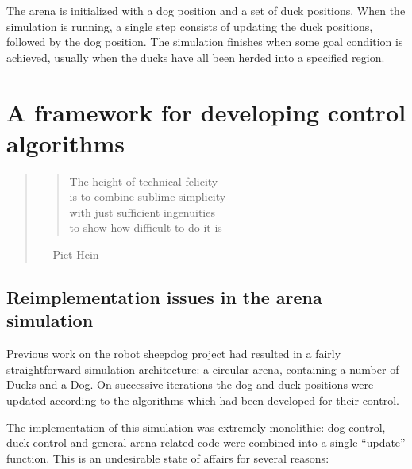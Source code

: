 \documentclass[a4paper]{report}
\begin{document}
The arena is initialized with a dog position and a set of duck
positions. When the simulation is running, a single step consists of
updating the duck positions, followed by the dog position. The
simulation finishes when some goal condition is achieved, usually when
the ducks have all been herded into a specified region.

\chapter{A framework for developing control algorithms}

\begin{quote}
  \begin{verse}
    The height of technical felicity\\
    is to combine sublime simplicity\\
    with just sufficient ingenuities\\
    to show how difficult to do it is
  \end{verse}
  {\hspace{5cm}--- Piet Hein}
\end{quote}

\section{Reimplementation issues in the arena simulation}

Previous work on the robot sheepdog project had resulted in a fairly
straightforward simulation architecture: a circular arena, containing
a number of Ducks and a Dog. On successive iterations the dog and duck
positions were updated according to the algorithms which had been
developed for their control.

The implementation of this simulation was extremely monolithic: dog
control, duck control and general arena-related code were combined
into a single ``update'' function. This is an undesirable state of
affairs for several reasons:
\end{document}
